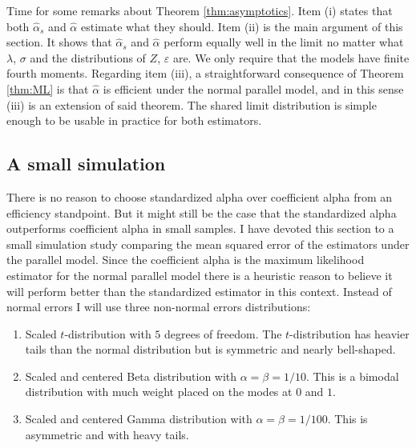 \documentclass[twoside]{article}
\begin{document}
Time for some remarks about Theorem \ref{thm:asymptotics}. Item (i) states that both $\hat{\alpha}_s$ and $\hat{\alpha}$ estimate what they should. Item (ii) is the main argument of this section. It shows that $\hat{\alpha}_{s}$ and $\hat{\alpha}$ perform equally well in the limit no matter what $\lambda$, $\sigma$ and the distributions of $Z$, $\varepsilon$ are. We only require that the models have finite fourth moments. Regarding item (iii), a straightforward consequence of Theorem \ref{thm:ML} is that $\hat{\alpha}$ is efficient under the normal parallel model, and in this sense (iii) is an extension of said theorem. The shared limit distribution is simple enough to be usable in practice for both estimators. 

\subsection{A small simulation}
There is no reason to choose standardized alpha over coefficient alpha from an efficiency standpoint. But it might still be the case
that the standardized alpha outperforms coefficient alpha
in small samples. I have devoted this section to a small simulation
study comparing the mean squared error of the estimators under
the parallel model. Since the coefficient alpha is the maximum likelihood
estimator for the normal parallel model there is a heuristic reason
to believe it will perform better than the standardized estimator
in this context. Instead of normal errors I will use three non-normal
errors distributions:

\begin{enumerate}
\item Scaled $t$-distribution with $5$ degrees of freedom. The $t$-distribution
has heavier tails than the normal distribution but is symmetric and nearly bell-shaped. 

\item Scaled and centered Beta distribution with $\alpha=\beta=1/10$. This is a bimodal distribution with much weight placed on the modes at $0$ and $1$. %
\item Scaled and centered Gamma distribution with $\alpha=\beta=1/100$. This is asymmetric and with heavy tails. %
\end{enumerate}
\end{document}
